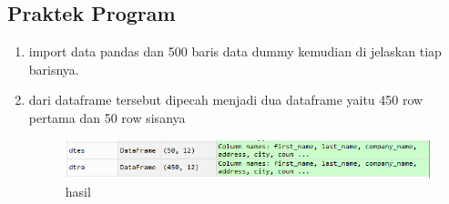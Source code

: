 \subsection{Praktek Program}
\begin{enumerate}
\item import data pandas dan 500 baris data dummy kemudian di jelaskan tiap barisnya.

	

\item dari dataframe tersebut dipecah menjadi dua dataframe yaitu 450 row pertama dan 50 row sisanya



\begin{figure}[H]
\centering
\includegraphics[scale=0.7]{figures/1174012/chapter4/7.PNG}
\caption{hasil}
\label{Praktek no 2}
\end{figure}		


\end{enumerate}
